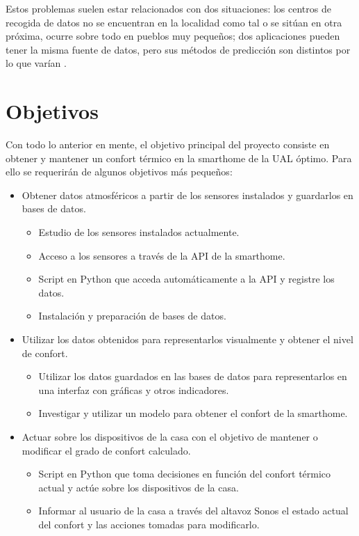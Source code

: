 Estos problemas suelen estar relacionados con dos situaciones: los centros de recogida de datos no se encuentran en la localidad como tal o se sitúan en otra próxima, ocurre sobre todo en pueblos muy pequeños; dos aplicaciones pueden tener la misma fuente de datos, pero sus métodos de predicción son distintos por lo que varían \cite{intro_3}.

\section{Objetivos}

Con todo lo anterior en mente, el objetivo principal del proyecto consiste en obtener y mantener un confort térmico en la smarthome de la UAL óptimo. Para ello se requerirán de algunos objetivos más pequeños:

\begin{itemize}
    \item Obtener datos atmosféricos a partir de los sensores instalados y guardarlos en bases de datos.
    \begin{itemize}
        \item Estudio de los sensores instalados actualmente.
        \item Acceso a los sensores a través de la API de la smarthome.
        \item Script en Python que acceda automáticamente a la API y registre los datos.
        \item Instalación y preparación de bases de datos.
    \end{itemize}
    \item Utilizar los datos obtenidos para representarlos visualmente y obtener el nivel de confort.
    \begin{itemize}
        \item Utilizar los datos guardados en las bases de datos para representarlos en una interfaz con gráficas y otros indicadores.
        \item Investigar y utilizar un modelo para obtener el confort de la smarthome.
    \end{itemize}
    \item Actuar sobre los dispositivos de la casa con el objetivo de mantener o modificar el grado de confort calculado.
    \begin{itemize}
        \item Script en Python que toma decisiones en función del confort térmico actual y actúe sobre los dispositivos de la casa.
        \item Informar al usuario de la casa a través del altavoz Sonos el estado actual del confort y las acciones tomadas para modificarlo.
    \end{itemize}
\end{itemize}


